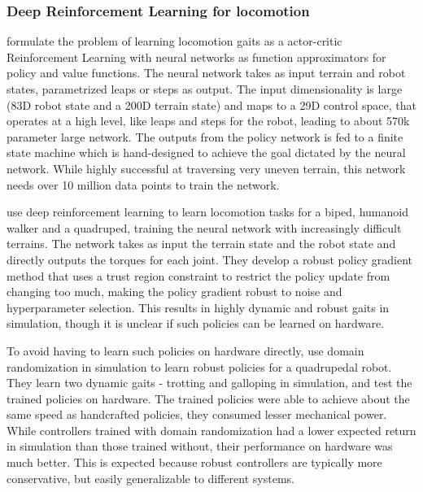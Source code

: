 \subsubsection{Deep Reinforcement Learning for locomotion}
\label{sec:deepRL}

\cite{peng2016terrain} formulate the problem of learning locomotion gaits as a actor-critic Reinforcement Learning with neural networks as function approximators for policy and value functions. The neural network takes as input terrain and robot states, parametrized leaps or steps as output. The input dimensionality is large (83D robot state and a 200D terrain state) and maps to a 29D control space, that operates at a high level, like leaps and steps for the robot, leading to about 570k parameter large network. The outputs from the policy network is fed to a finite state machine which is hand-designed to achieve the goal dictated by the neural network. While highly successful at traversing very uneven terrain, this network needs over 10 million data points to train the network. 

\cite{heess2017emergence} use deep reinforcement learning to learn locomotion tasks for a biped, humanoid walker and a quadruped, training the neural network with increasingly difficult terrains. The network takes as input the terrain state and the robot state and directly outputs the torques for each joint. They develop a robust policy gradient method that uses a trust region constraint to restrict the policy update from changing too much, making the policy gradient robust to noise and hyperparameter selection. This results in highly dynamic and robust gaits in simulation, though it is unclear if such policies can be learned on hardware.

To avoid having to learn such policies on hardware directly, \cite{tan2018sim} use domain randomization in simulation to learn robust policies for a quadrupedal robot. They learn two dynamic gaits - trotting and galloping in simulation, and test the trained policies on hardware. The trained policies were able to achieve about the same speed as handcrafted policies, they consumed lesser mechanical power. While controllers trained with domain randomization had a lower expected return in simulation than those trained without, their performance on hardware was much better. This is expected because robust controllers are typically more conservative, but easily generalizable to different systems.

